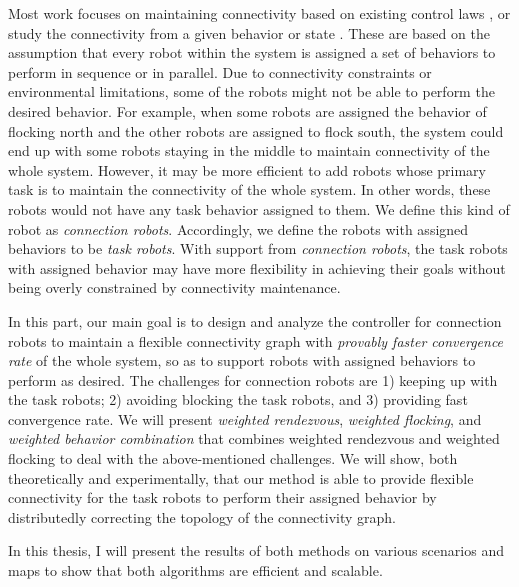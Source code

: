 \documentclass[../main.tex]{subfiles}
\begin{document}
Most work focuses on maintaining connectivity based on existing control laws \cite{zavlanos2008distributed, hollinger2010multi}, or study the connectivity from a given behavior or state \cite{sabattini2013distributed, olfati2007consensus}. These are based on the assumption that every robot within the system is assigned a set of behaviors to perform in sequence \cite{nagavalli2017automated} or in parallel. Due to connectivity constraints or environmental limitations, some of the robots might not be able to perform the desired behavior. For example, when some robots are assigned the behavior of flocking north and the other robots are assigned to flock south, the system could end up with some robots staying in the middle to maintain connectivity of the whole system. However, it may be more efficient to add robots whose primary task is to maintain the connectivity of the whole system. In other words, these robots would not have any task behavior assigned to them. We define this kind of robot as \textit{connection robots}. Accordingly, we define the robots with assigned behaviors to be \textit{task robots}. With support from \textit{connection robots}, the task robots with assigned behavior may have more flexibility in achieving their goals without being overly constrained by connectivity maintenance.

In this part, our main goal is to design and analyze the controller for connection robots to maintain a flexible connectivity graph with \textit{provably faster convergence rate} of the whole system, so as to support robots with assigned behaviors to perform as desired. The challenges for connection robots are 1) keeping up with the task robots; 2) avoiding blocking the task robots, and 3) providing fast convergence rate. We will present \textit{weighted rendezvous}, \textit{weighted flocking}, and \textit{weighted behavior combination} that combines weighted rendezvous and weighted flocking to deal with the above-mentioned challenges. We will show, both theoretically and experimentally, that our method is able to provide flexible connectivity for the task robots to perform their assigned behavior by distributedly correcting the topology of the connectivity graph.

In this thesis, I will present the results of both methods on various scenarios and maps to show that both algorithms are efficient and scalable.
\end{document}
